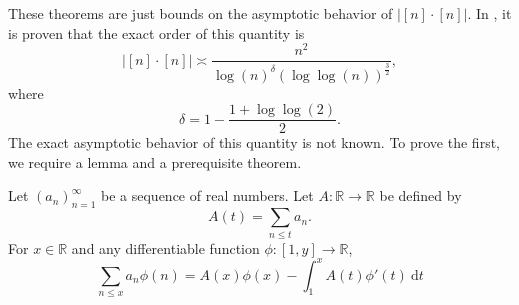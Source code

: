 \documentclass[12pt,reqno]{amsart}
\begin{document}
These theorems are just bounds on the asymptotic behavior of \(\left\lvert [n] \cdot [n] \right\rvert \). 
In \cite{Ford}, it is proven that the exact order of this quantity is
\[
    \left\lvert [n] \cdot [n] \right\rvert \asymp \frac{n^{2}}{\log \left( n \right) ^{\delta} \left( \log \log \left( n \right) \right) ^{\frac{3}{2} } } 
,\]
where
\[
    \delta = 1 - \frac{1 + \log \log \left( 2 \right)  }{2} 
.\]
The exact asymptotic behavior of this quantity is not known.
To prove the first, we require a lemma and a prerequisite theorem.

\begin{lemma*}
Let \(\left( a_{n}  \right) _{n = 1} ^{\infty }\) be a sequence of real numbers. Let \(A: \mathbb{R} \to \mathbb{R} \) be defined by
\[
    A(t) = \sum _{n \leq t} a_{n} 
.\]
For \(x \in \mathbb{R} \) and any differentiable function \(\phi : [1,y] \to \mathbb{R} \),
\[
    \sum _{n \leq x} a_{n} \phi(n) = A(x)\phi(x) - \int_{1}^{x} A(t)\phi'(t) ~\mathrm{d} t
\]
\end{lemma*}
\end{document}
